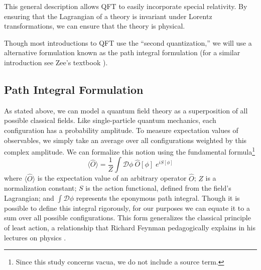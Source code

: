 \documentclass[12pt]{report}
\begin{document}
This general description allows QFT to easily incorporate special relativity. By ensuring that the Lagrangian of a theory is invariant under Lorentz transformations, we can ensure that the theory is physical. %

Though most introductions to QFT use the ``second quantization,'' we will use a alternative formulation known as the path integral formulation (for a similar introduction see Zee's textbook \cite{zee2010}).
 
\subsection{Path Integral Formulation}

As stated above, we can model a quantum field theory as a superposition of all possible classical fields. Like single-particle quantum mechanics, each configuration has a probability amplitude. To measure expectation values of observables, we simply take an average over all configurations weighted by this complex amplitude. We can formalize this notion using the fundamental formula\footnote{Since this study concerns vacua, we do not include a source term.}
\begin{equation}
    \label{eq:pathintegral}
    \langle \hat O \rangle = \frac{1}{Z} \int \mathcal{D}\phi \: \hat O [\phi]\; e^{iS[\phi]}
\end{equation}
where $\langle \hat O \rangle$ is the expectation value of an arbitrary operator $\hat O$; $Z$ is a normalization constant; $S$ is the action functional, defined from the field's Lagrangian; and $\int \mathcal{D}\phi$ represents the eponymous path integral. Though it is possible to define this integral rigorously, for our purposes we can equate it to a sum over all possible configurations. This form generalizes the classical principle of least action, a relationship that Richard Feynman pedagogically explains in his lectures on physics \cite{feynman1963a}. 
\end{document}
